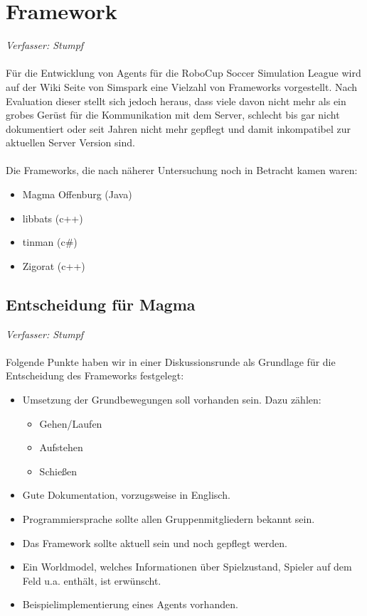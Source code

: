 \documentclass[fontsize=12pt,a4paper,final]{scrartcl}[2003/01/01]
\begin{document}
\section{Framework}
\textit{Verfasser: Stumpf}\\
\\
Für die Entwicklung von Agents für die RoboCup Soccer Simulation League wird auf der Wiki Seite von Simspark eine Vielzahl von Frameworks vorgestellt. Nach Evaluation dieser stellt sich jedoch heraus, dass viele davon nicht mehr als ein grobes Gerüst für die Kommunikation mit dem Server, schlecht bis gar nicht dokumentiert oder seit Jahren nicht mehr gepflegt und damit inkompatibel zur aktuellen Server Version sind.\\
\\
Die Frameworks, die nach näherer Untersuchung noch in Betracht kamen waren:
\begin{itemize}
\item Magma Offenburg (Java)
\item libbats (c++)
\item tinman (c\#)
\item Zigorat (c++)
\end{itemize}

\subsection{Entscheidung für Magma}
\textit{Verfasser: Stumpf}\\
\\
Folgende Punkte haben wir in einer Diskussionsrunde als Grundlage für die Entscheidung des Frameworks festgelegt:
\begin{itemize}
\item Umsetzung der Grundbewegungen soll vorhanden sein. Dazu zählen:
	\begin{itemize}
	\item Gehen/Laufen
	\item Aufstehen
	\item Schie{\ss}en
	\end{itemize}
\item Gute Dokumentation, vorzugsweise in Englisch.
\item Programmiersprache sollte allen Gruppenmitgliedern bekannt sein. 
\item Das Framework sollte aktuell sein und noch gepflegt werden.
\item Ein Worldmodel, welches Informationen über Spielzustand, Spieler auf dem Feld u.a. enthält, ist erwünscht.
\item Beispielimplementierung eines Agents vorhanden.
\end{itemize}
\end{document}
